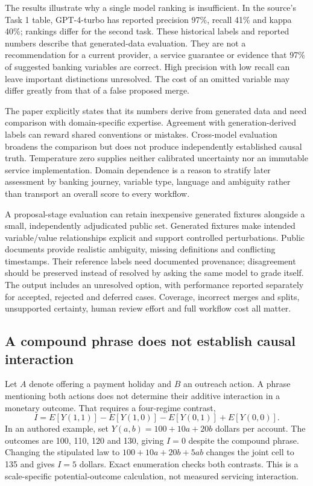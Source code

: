 The results illustrate why a single model ranking is insufficient. In the source's Task 1 table, GPT-4-turbo has reported precision 97\%, recall 41\% and kappa 40\%; rankings differ for the second task. These historical labels and reported numbers describe that generated-data evaluation. They are not a recommendation for a current provider, a service guarantee or evidence that 97\% of suggested banking variables are correct. High precision with low recall can leave important distinctions unresolved. The cost of an omitted variable may differ greatly from that of a false proposed merge.~\citep{exec28_cm_razouk}

The paper explicitly states that its numbers derive from generated data and need comparison with domain-specific expertise. Agreement with generation-derived labels can reward shared conventions or mistakes. Cross-model evaluation broadens the comparison but does not produce independently established causal truth. Temperature zero supplies neither calibrated uncertainty nor an immutable service implementation. Domain dependence is a reason to stratify later assessment by banking journey, variable type, language and ambiguity rather than transport an overall score to every workflow.

A proposal-stage evaluation can retain inexpensive generated fixtures alongside a small, independently adjudicated public set. Generated fixtures make intended variable/value relationships explicit and support controlled perturbations. Public documents provide realistic ambiguity, missing definitions and conflicting timestamps. Their reference labels need documented provenance; disagreement should be preserved instead of resolved by asking the same model to grade itself. The output includes an unresolved option, with performance reported separately for accepted, rejected and deferred cases. Coverage, incorrect merges and splits, unsupported certainty, human review effort and full workflow cost all matter.

\subsection{A compound phrase does not establish causal interaction}

Let $A$ denote offering a payment holiday and $B$ an outreach action. A phrase mentioning both actions does not determine their additive interaction in a monetary outcome. That requires a four-regime contrast,
\begin{equation}
 I=E[Y(1,1)]-E[Y(1,0)]-E[Y(0,1)]+E[Y(0,0)].
 \label{eq:exec28-cm-interaction}
\end{equation}
In an authored example, set $Y(a,b)=100+10a+20b$ dollars per account. The outcomes are 100, 110, 120 and 130, giving $I=0$ despite the compound phrase. Changing the stipulated law to $100+10a+20b+5ab$ changes the joint cell to 135 and gives $I=5$ dollars. Exact enumeration checks both contrasts. This is a scale-specific potential-outcome calculation, not measured servicing interaction.~\citep{exec28_cm_reference}

